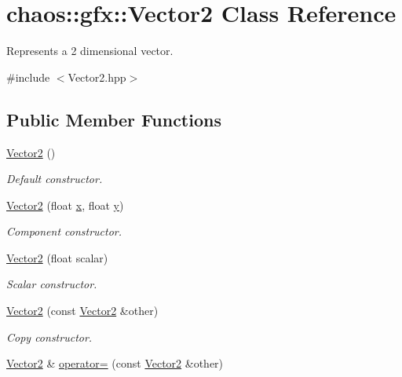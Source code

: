 \hypertarget{classchaos_1_1gfx_1_1_vector2}{\section{chaos\-:\-:gfx\-:\-:Vector2 Class Reference}
\label{classchaos_1_1gfx_1_1_vector2}
}


Represents a 2 dimensional vector.  




{\ttfamily \#include $<$Vector2.\-hpp$>$}

\subsection*{Public Member Functions}
\begin{DoxyCompactItemize}
\item 
\hyperlink{classchaos_1_1gfx_1_1_vector2_a9803cd26cb4f18bd3bc0f646af5bc35e}{Vector2} ()
\begin{DoxyCompactList}\small\item\em Default constructor. \end{DoxyCompactList}\item 
\hyperlink{classchaos_1_1gfx_1_1_vector2_ac01190ae1b84237183e213db95fd0606}{Vector2} (float \hyperlink{classchaos_1_1gfx_1_1_vector2_a98989a2809ad9c6ac3091550ad5f5118}{x}, float \hyperlink{classchaos_1_1gfx_1_1_vector2_adf4d8ed8e49c84c2fe1596c2b9d55d49}{y})
\begin{DoxyCompactList}\small\item\em Component constructor. \end{DoxyCompactList}\item 
\hyperlink{classchaos_1_1gfx_1_1_vector2_adb6901e860aeb3c7bffb4235d75ffaa6}{Vector2} (float scalar)
\begin{DoxyCompactList}\small\item\em Scalar constructor. \end{DoxyCompactList}\item 
\hyperlink{classchaos_1_1gfx_1_1_vector2_ac09ba6b8b19d06f79a2de9498fdc272c}{Vector2} (const \hyperlink{classchaos_1_1gfx_1_1_vector2}{Vector2} \&other)
\begin{DoxyCompactList}\small\item\em Copy constructor. \end{DoxyCompactList}\item 
\hyperlink{classchaos_1_1gfx_1_1_vector2}{Vector2} \& \hyperlink{classchaos_1_1gfx_1_1_vector2_a8d20c5c57ae0f34a83710df13846c9ef}{operator=} (const \hyperlink{classchaos_1_1gfx_1_1_vector2}{Vector2} \&other)

\end{DoxyCompactItemize}
